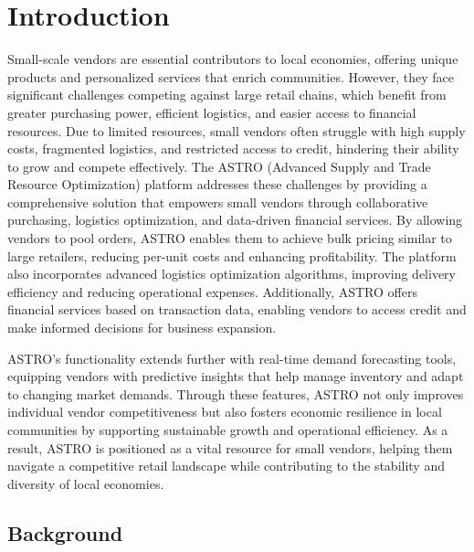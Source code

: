 \chapter{Introduction}
	
Small-scale vendors are essential contributors to local economies, offering unique products and
personalized services that enrich communities. However, they face significant challenges
competing against large retail chains, which benefit from greater purchasing power, efficient
logistics, and easier access to financial resources. Due to limited resources, small vendors often
struggle with high supply costs, fragmented logistics, and restricted access to credit, hindering
their ability to grow and compete effectively.
The ASTRO (Advanced Supply and Trade Resource Optimization) platform addresses these
challenges by providing a comprehensive solution that empowers small vendors through
collaborative purchasing, logistics optimization, and data-driven financial services. By allowing
vendors to pool orders, ASTRO enables them to achieve bulk pricing similar to large retailers,
reducing per-unit costs and enhancing profitability. The platform also incorporates advanced
logistics optimization algorithms, improving delivery efficiency and reducing operational
expenses. Additionally, ASTRO offers financial services based on transaction data, enabling
vendors to access credit and make informed decisions for business expansion.

ASTRO’s functionality extends further with real-time demand forecasting tools, equipping
vendors with predictive insights that help manage inventory and adapt to changing market
demands. Through these features, ASTRO not only improves individual vendor competitiveness
but also fosters economic resilience in local communities by supporting sustainable growth and
operational efficiency. As a result, ASTRO is positioned as a vital resource for small vendors,
helping them navigate a competitive retail landscape while contributing to the stability and
diversity of local economies.
	\section{Background}
	
